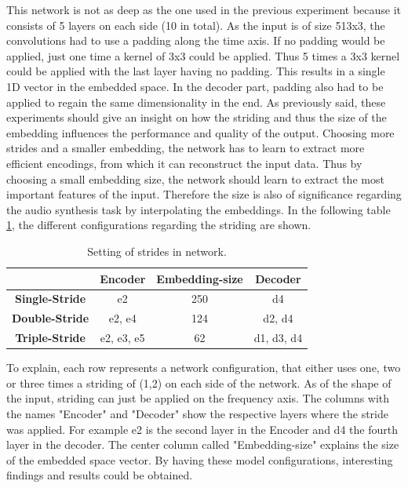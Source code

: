 This network is not as deep as the one used in the previous experiment because it consists of 5 layers on each side (10 in total). As the input is of size 513x3, the convolutions had to use a padding along the time axis. If no padding would be applied, just one time a kernel of 3x3 could be applied. Thus 5 times a 3x3 kernel could be applied with the last layer having no padding. This results in a single 1D vector in the embedded space. In the decoder part, padding also had to be applied to regain the same dimensionality in the end. As previously said, these experiments should give an insight on how the striding and thus the size of the embedding influences the performance and quality of the output. Choosing more strides and a smaller embedding, the network has to learn to extract more efficient encodings, from which it can reconstruct the input data. Thus by choosing a small embedding size, the network should learn to extract the most important features of the input. Therefore the size is also of significance regarding the audio synthesis task by interpolating the embeddings. In the following table \ref{tab:exp_2D_strides}, the different configurations regarding the striding are shown. 


\begin{table}[htb!]
    \centering
    \begin{tabular}{|c|c|c|c|}
        \hline
         &\textbf{Encoder}&\textbf{Embedding-size}&\textbf{Decoder} \\
         \hline
        \textbf{Single-Stride} & e2 & 250 & d4 \\
        \hline
        \textbf{Double-Stride} & e2, e4 & 124 & d2, d4 \\
        \hline
        \textbf{Triple-Stride} & e2, e3, e5 & 62 & d1, d3, d4 \\
        \hline
    \end{tabular}
    \caption{Setting of strides in network.}
    \label{tab:exp_2D_strides}
\end{table}

To explain, each row represents a network configuration, that either uses one, two or three times a striding of (1,2) on each side of the network. As of the shape of the input, striding can just be applied on the frequency axis. The columns with the names "Encoder" and "Decoder" show the respective layers where the stride was applied. For example e2 is the second layer in the Encoder and d4 the fourth layer in the decoder. The center column called "Embedding-size" explains the size of the embedded space vector. By having these model configurations, interesting findings and results could be obtained. 

